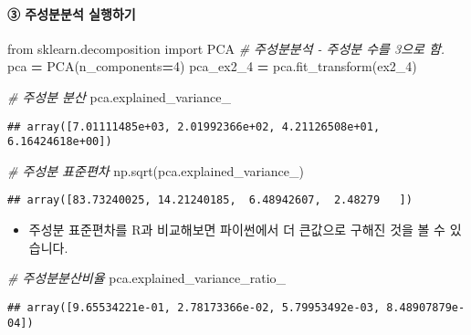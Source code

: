 \documentclass[
]{article}
\newenvironment{Shaded}{\begin{snugshade}}{\end{snugshade}}
\newcommand{\CommentTok}[1]{\textcolor[rgb]{0.56,0.35,0.01}{\textit{#1}}}
\newcommand{\DecValTok}[1]{\textcolor[rgb]{0.00,0.00,0.81}{#1}}
\newcommand{\ImportTok}[1]{#1}
\newcommand{\NormalTok}[1]{#1}
\newcommand{\OperatorTok}[1]{\textcolor[rgb]{0.81,0.36,0.00}{\textbf{#1}}}
\providecommand{\tightlist}{%
  \setlength{\itemsep}{0pt}\setlength{\parskip}{0pt}}
\begin{document}
\hypertarget{uxc8fcuxc131uxbd84uxbd84uxc11d-uxc2e4uxd589uxd558uxae30-1}{%
\paragraph{③ 주성분분석
실행하기}\label{uxc8fcuxc131uxbd84uxbd84uxc11d-uxc2e4uxd589uxd558uxae30-1}}

\begin{Shaded}
\begin{Highlighting}[]
\ImportTok{from}\NormalTok{ sklearn.decomposition }\ImportTok{import}\NormalTok{ PCA}
\CommentTok{\# 주성분분석 {-} 주성분 수를 3으로 함.}
\NormalTok{pca }\OperatorTok{=}\NormalTok{ PCA(n\_components}\OperatorTok{=}\DecValTok{4}\NormalTok{)}
\NormalTok{pca\_ex2\_4 }\OperatorTok{=}\NormalTok{ pca.fit\_transform(ex2\_4)}

\CommentTok{\# 주성분 분산}
\NormalTok{pca.explained\_variance\_}
\end{Highlighting}
\end{Shaded}

\begin{verbatim}
## array([7.01111485e+03, 2.01992366e+02, 4.21126508e+01, 6.16424618e+00])
\end{verbatim}

\begin{Shaded}
\begin{Highlighting}[]
\CommentTok{\# 주성분 표준편차}
\NormalTok{np.sqrt(pca.explained\_variance\_)}
\end{Highlighting}
\end{Shaded}

\begin{verbatim}
## array([83.73240025, 14.21240185,  6.48942607,  2.48279   ])
\end{verbatim}

\begin{itemize}
\tightlist
\item
  주성분 표준편차를 R과 비교해보면 파이썬에서 더 큰값으로 구해진 것을 볼
  수 있습니다.
\end{itemize}

\begin{Shaded}
\begin{Highlighting}[]
\CommentTok{\# 주성분분산비율}
\NormalTok{pca.explained\_variance\_ratio\_}
\end{Highlighting}
\end{Shaded}

\begin{verbatim}
## array([9.65534221e-01, 2.78173366e-02, 5.79953492e-03, 8.48907879e-04])
\end{verbatim}
\end{document}
